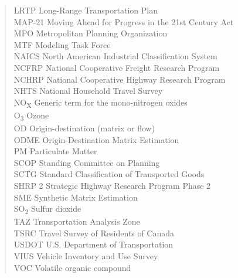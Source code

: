 \begin{quote}
\begin{tabbing}
LRTP \> Long-Range Transportation Plan \\
MAP-21 \> Moving Ahead for Progress in the 21st Century Act \\
MPO \> Metropolitan Planning Organization \\
MTF \> Modeling Task Force \\
NAICS \> North American Industrial Classification System \\
NCFRP \> National Cooperative Freight Research Program \\
NCHRP \> National Cooperative Highway Research Program \\
NHTS \> National Household Travel Survey \\
NO\textsubscript{X} \> Generic term for the mono-nitrogen oxides \\
O\textsubscript{3} \> Ozone \\
OD \> Origin-destination (matrix or flow) \\
ODME \> Origin-Destination Matrix Estimation \\
PM \> Particulate Matter \\
SCOP \> Standing Committee on Planning \\
SCTG \> Standard Classification of Transported Goods \\
SHRP 2 \> Strategic Highway Research Program Phase 2 \\
SME \> Synthetic Matrix Estimation \\
SO\textsubscript{2} \> Sulfur dioxide \\
TAZ \> Transportation Analysis Zone \\
TSRC \> Travel Survey of Residents of Canada \\
USDOT \> U.S. Department of Transportation \\
VIUS \> Vehicle Inventory and Use Survey \\
VOC \> Volatile organic compound \\


\end{tabbing}
\end{quote}